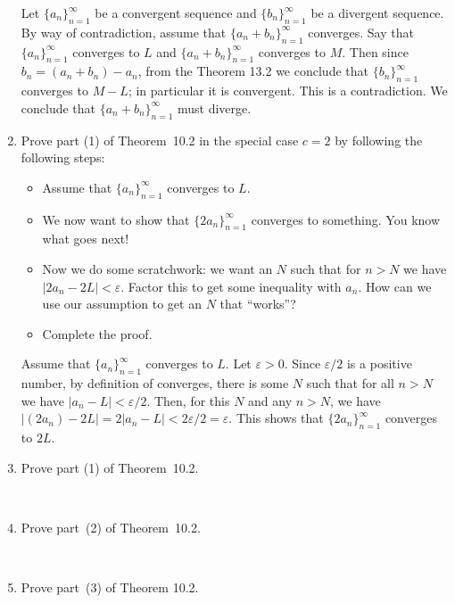 \documentclass[12pt]{amsart}
\def\e{\varepsilon}
\numberwithin{equation}{section}
\theoremstyle{plain} %
\theoremstyle{definition}
\theoremstyle{remark}
\begin{document}
\begin{enumerate}
\begin{framed} Let $\{a_n\}_{n=1}^\infty$ be a convergent sequence and $\{b_n\}_{n=1}^\infty$ be a divergent sequence. By way of contradiction, assume that $\{a_n + b_n\}_{n=1}^{\infty}$ converges. Say that $\{a_n\}_{n=1}^\infty$  converges to $L$ and $\{a_n + b_n\}_{n=1}^{\infty}$ converges to $M$. Then since $b_n = (a_n+b_n)-a_n$, from the Theorem 13.2 we conclude that $\{b_n\}_{n=1}^\infty$ converges to $M-L$; in particular it is convergent. This is a contradiction.  We conclude that $\{a_n + b_n\}_{n=1}^{\infty}$ must diverge.
\end{framed}

\item Prove part (1) of Theorem~10.2  in the special case $c=2$ by following the following steps:
\begin{itemize}
\item Assume that $\{a_n \}_{n=1}^\infty$ converges to $L$.
\item We now want to show that $\{ 2 a_n \}_{n=1}^\infty$ converges to something. You know what goes next!
\item Now we do some scratchwork: we want an $N$ such that for $n>N$ we have $|2 a_n - 2 L| < \e$. Factor this to get some inequality with $a_n$. How can we use our assumption to get an $N$ that ``works''?
\item Complete the proof.
\end{itemize}

\begin{framed} 
Assume that $\{a_n \}_{n=1}^\infty$ converges to $L$. Let $\e>0$. Since $\e/2$ is a positive number, by definition of converges, there is some $N$ such that for all $n>N$ we have $|a_n-L|<\e/2$. Then, for this $N$ and any $n>N$, we have $|(2a_n) - 2L| = 2 | a_n - L| < 2 \e/2 = \e$.
This shows that $\{2 a_n \}_{n=1}^\infty$ converges to $2L$. 
\end{framed}

\item Prove part (1) of Theorem~10.2.

\

\item Prove part~(2) of Theorem~10.2.

\

\item Prove part~(3) of Theorem 10.2.
\end{enumerate}



\newpage
\end{document}
